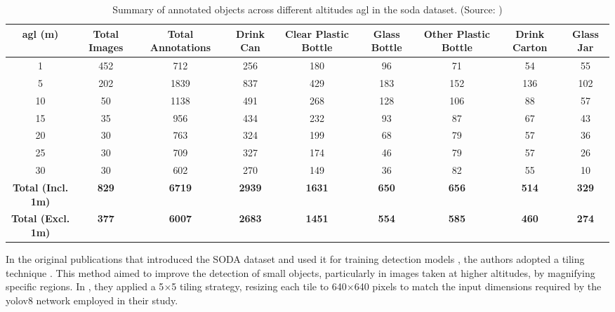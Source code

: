 \begin{table}[ht]
    \centering
    \begin{adjustbox}{max width=\textwidth}
    \renewcommand{\arraystretch}{2}%
    \begin{tabular}{|c|c|c|c|c|c|c|c|c|}
        \hline
        \textbf{\gls{agl} (m)} & \textbf{Total Images} & \textbf{Total Annotations} & \textbf{Drink Can} & \textbf{Clear Plastic Bottle} & \textbf{Glass Bottle} & \textbf{Other Plastic Bottle} & \textbf{Drink Carton} & \textbf{Glass Jar} \\
        \hline \hline
        1  & 452 & 712  & 256 & 180 & 96  & 71  & 54  & 55 \\
        \hline
        5  & 202 & 1839 & 837 & 429 & 183 & 152 & 136 & 102 \\
        \hline
        10 & 50  & 1138 & 491 & 268 & 128 & 106 & 88  & 57 \\
        \hline
        15 & 35  & 956  & 434 & 232 & 93  & 87  & 67  & 43 \\
        \hline
        20 & 30  & 763  & 324 & 199 & 68  & 79  & 57  & 36 \\
        \hline
        25 & 30  & 709  & 327 & 174 & 46  & 79  & 57  & 26 \\
        \hline
        30 & 30  & 602  & 270 & 149 & 36  & 82  & 55  & 10 \\
        \hline \hline
        \textbf{Total (Incl. 1m)} & \textbf{829} & \textbf{6719} & \textbf{2939} & \textbf{1631} & \textbf{650} & \textbf{656} & \textbf{514} & \textbf{329} \\
        \hline
        \textbf{Total (Excl. 1m)} & \textbf{377} & \textbf{6007} & \textbf{2683} & \textbf{1451} & \textbf{554} & \textbf{585} & \textbf{460} & \textbf{274} \\
        \hline
    \end{tabular}
    \renewcommand{\arraystretch}{1}%
    \end{adjustbox}
    \caption{Summary of annotated objects across different altitudes \gls{agl} in the \gls{soda} dataset. (Source: \cite{soda_dataset})}
    \label{tab:soda_annotation_summary}
\end{table}

In the original publications that introduced the SODA dataset and used it for training detection models \cite{soda_dataset, detect_litter}, the authors adopted a tiling technique \cite{tiling, sahi_detection}. This method aimed to improve the detection of small objects, particularly in images taken at higher altitudes, by magnifying specific regions. In \cite{detect_litter}, they applied a 5$\times$5 tiling strategy, resizing each tile to 640$\times$640 pixels to match the input dimensions required by the \gls{yolo}v8 \cite{yolov8} network employed in their study.

